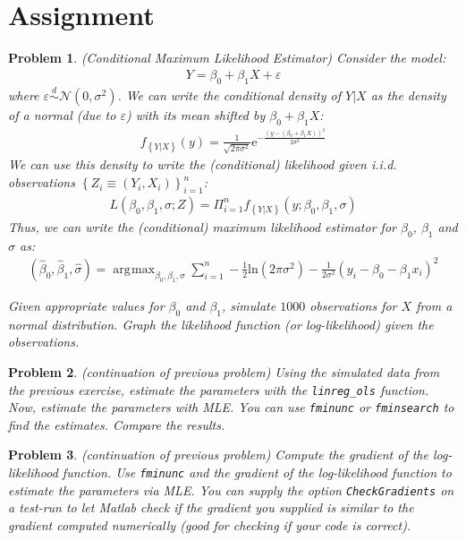 \documentclass[12pt, a4paper]{article}
\newcommand{\e}[1]{\text{e}^{#1}}
\newcommand{\Normal}[1]{\mathcal{N}\left(0, #1\right)}
\newcommand{\Set}[1]{\left\{#1\right\}}
\renewcommand{\ln}[1]{\text{ln}\left(#1\right)}
\DeclareMathOperator*{\argmax}{\arg\!\max}
\newtheorem{problem}{Problem}
\begin{document}
\section{Assignment}
\label{sec:orga0aff60}
\begin{problem}
(Conditional Maximum Likelihood Estimator)
Consider the model:
\begin{align*}
Y = \beta_0 + \beta_1X + \varepsilon
\end{align*}
where \(\varepsilon\overset{d}{\sim}\Normal{\sigma^2}\).
We can write the conditional density of \(Y\vert X\) as the density of a normal (due to \(\varepsilon\)) with its mean shifted by \(\beta_0+\beta_1X\):
\begin{align*}
f_{\Set{Y\vert X}}(y)=\frac{1}{\sqrt{2\pi\sigma^2}}\e{-\frac{(y-(\beta_0+\beta_1X))^2}{2\sigma^2}}
\end{align*}
We can use this density to write the (conditional) likelihood given i.i.d. observations \(\Set{Z_i\equiv(Y_i, X_i)}_{i=1}^n\):
\begin{align*}
L(\beta_0,\beta_1,\sigma; Z) = \Pi_{i=1}^n f_{\Set{Y\vert X}}(y; \beta_0,\beta_1,\sigma)
\end{align*}
Thus, we can write the (conditional) maximum likelihood estimator for \(\beta_0\), \(\beta_1\) and \(\sigma\) as:
\begin{align*}
(\hat{\beta}_0, \hat{\beta}_1, \hat{\sigma}) = \argmax_{\beta_0, \beta_1, \sigma}{\sum_{i=1}^n-\frac{1}{2}\ln{2\pi\sigma^2}-\frac{1}{2\sigma^2}(y_i-\beta_0-\beta_1x_i)^2}
\end{align*}

Given appropriate values for \(\beta_0\) and \(\beta_1\), simulate \(1000\) observations for \(X\) from a normal distribution.
Graph the likelihood function (or log-likelihood) given the observations.
\end{problem}

\begin{problem}
(continuation of previous problem)
Using the simulated data from the previous exercise, estimate the parameters with the \texttt{linreg\_ols} function.
Now, estimate the parameters with MLE.
You can use \texttt{fminunc} or \texttt{fminsearch} to find the estimates.
Compare the results.
\end{problem}

\begin{problem}
(continuation of previous problem)
Compute the gradient of the log-likelihood function.
Use \texttt{fminunc} and the gradient of the log-likelihood function to estimate the parameters via MLE.
You can supply the option \texttt{CheckGradients} on a test-run to let Matlab check if the gradient you supplied is similar to the gradient computed numerically (good for checking if your code is correct).
\end{problem}
\end{document}
